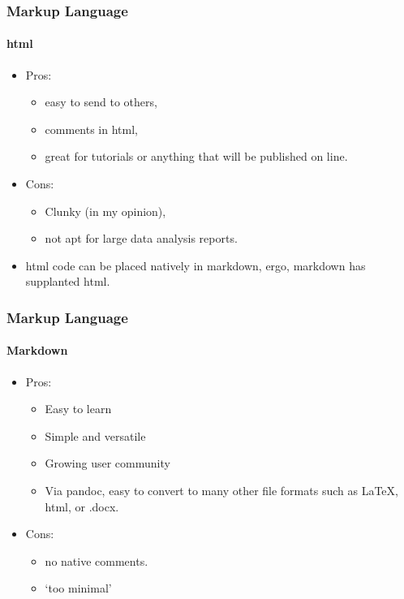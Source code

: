 \documentclass[t]{beamer}\usepackage[]{graphicx}\usepackage[]{color}
\begin{document}
\begin{frame}
  \frametitle{Markup Language}
  \framesubtitle{html}
  \begin{itemize}
    \item Pros: 
      \begin{itemize}
        \item easy to send to others, 
        \item comments in html, 
        \item great for tutorials or anything that will be published on line.
      \end{itemize}
    \item Cons: 
      \begin{itemize}
        \item Clunky (in my opinion), 
        \item not apt for large data analysis reports.
      \end{itemize}

    \item html code can be placed natively in markdown, ergo, markdown has
      supplanted html.
  \end{itemize}
\end{frame}

\begin{frame}
  \frametitle{Markup Language}
  \framesubtitle{Markdown}
  \begin{itemize}
    \item Pros: 
      \begin{itemize}
        \item Easy to learn 
        \item Simple and versatile
        \item Growing user community  
        \item Via pandoc, easy to convert to many other file formats such as
          \LaTeX, html, or .docx.
      \end{itemize}
    \item Cons: 
      \begin{itemize}
        \item no native comments.  
        \item `too minimal'
      \end{itemize}
  \end{itemize}
\end{frame}
\end{document}
